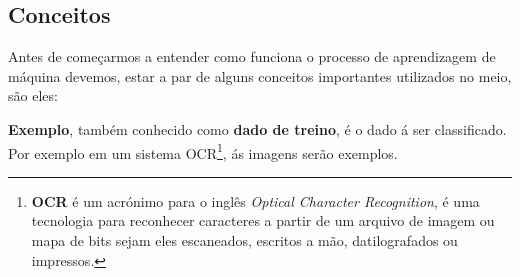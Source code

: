  \subsection{Conceitos}
 \label{cap:conceitos}
 Antes de começarmos a entender como funciona o processo de aprendizagem de máquina devemos, estar a par de alguns conceitos importantes 
 utilizados no meio, são eles:
  \begin{alineas}
  	\item \textbf{Exemplo}, também conhecido como \textbf{dado de treino}, é o dado á ser classificado. Por exemplo em um sistema OCR\footnote{\cite{ocr}\textbf{OCR} é um acrónimo para o inglês \textit{Optical Character Recognition}, é uma tecnologia para reconhecer caracteres a partir de um arquivo de imagem ou mapa de bits sejam eles escaneados, escritos a mão, datilografados ou impressos.}, 
	ás imagens serão exemplos. 
  \end{alineas}   